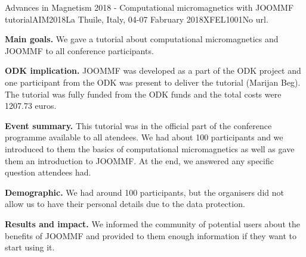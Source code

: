 \begin{event}{Advances in Magnetism 2018 - Computational micromagnetics with JOOMMF tutorial}{AIM2018}{La Thuile, Italy, 04-07 Fabruary 2018}{XFEL}{100}{1}{No url.}

\textbf{Main goals.} We gave a tutorial about computational micromagnetics and JOOMMF to all conference participants.

\textbf{ODK implication.} JOOMMF was developed as a part of the ODK project and one participant from the ODK was present to deliver the tutorial (Marijan Beg). The tutorial was fully funded from the ODK funds and the total costs were 1207.73 euros.

\textbf{Event summary.} This tutorial was in the official part of the conference programme available to all atendees. We had about 100 participants and we introduced to them the basics of computational micromagnetics as well as gave them an introduction to JOOMMF. At the end, we answered any specific question attendees had.

\textbf{Demographic.} We had around 100 participants, but the organisers did not allow us to have their personal details due to the data protection.

\textbf{Results and impact.} We informed the community of potential users about the benefits of JOOMMF and provided to them enough information if they want to start using it.

\end{event}
